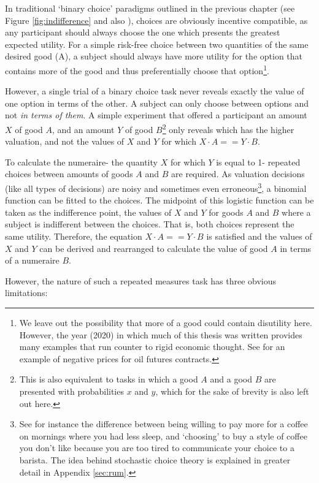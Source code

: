 In traditional ‘binary choice’ paradigms outlined in the previous chapter (see Figure \ref{fig:indifference} and also \cite{mostellerExperimentalMeasurementUtility1951}), choices are obviously incentive compatible, as any participant should always choose the one which presents the greatest expected utility. For a simple risk-free choice between two quantities of the same desired good (A), a subject should always have more utility for the option that contains more of the good and thus preferentially choose that option\footnote{We leave out the possibility that more of a good could contain disutility here. However, the year (2020) in which much of this thesis was written provides many examples that run counter to rigid economic thought. See \cite{kubursi2020oil} for an example of negative prices for oil futures contracts.}.

However, a single trial of a binary choice task never reveals exactly the value of one option in terms of the other. A subject can only choose between options and not \textit{in terms of them}. A simple experiment that offered a participant an amount $X$ of good $A$, and an amount $Y$ of good $B$\footnote{This is also equivalent to tasks in which a good $A$ and a good $B$ are presented with probabilities $x$ and $y$, which for the sake of brevity is also left out here.} only reveals which has the higher valuation, and not the values of $X$ and $Y$ for which $X \cdot A == Y \cdot B$.

To calculate the numeraire- the quantity $X$ for which $Y$ is equal to 1- repeated choices between amounts of goods $A$ and $B$ are required. As valuation decisions (like all types of decisions) are noisy and sometimes even erroneous\footnote{See for instance the difference between being willing to pay more for a coffee on mornings where you had less sleep, and ‘choosing’ to buy a style of coffee you don’t like because you are too tired to communicate your choice to a barista. The idea behind stochastic choice theory is explained in greater detail in Appendix \ref{sec:rum}.}, a binomial function can be fitted to the choices. The midpoint of this logistic function can be taken as the indifference point, the values of $X$ and $Y$ for goods $A$ and $B$ where a subject is indifferent between the choices. That is, both choices represent the same utility. Therefore, the equation $X \cdot A == Y \cdot B$ is satisfied and the values of $X$ and $Y$ can be derived and rearranged to calculate the value of good $A$ in terms of a numeraire $B$.

However, the nature of such a repeated measures task has three obvious limitations:

